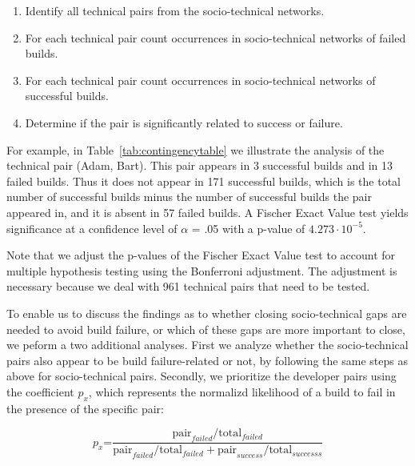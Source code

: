 \documentclass{sig-alternate}
\begin{document}


\begin{enumerate}
\item Identify all technical pairs from the socio-technical networks.
\item For each technical pair count occurrences in socio-technical networks of
failed builds.
\item For each technical pair count occurrences in socio-technical networks of
successful builds.
\item Determine if the pair is significantly related to success or failure.
\end{enumerate}

For example, in Table~\ref{tab:contingencytable} we illustrate the analysis of
the technical pair (Adam, Bart). This pair appears in 3 successful builds and in
13 failed builds. Thus it does not appear in 171 successful builds, which is the total number of successful builds minus the number of successful builds the pair appeared in, and it is absent in 57 failed builds.
A Fischer Exact Value test yields significance at a confidence level of $\alpha$ = .05 with a p-value of $4.273\cdot10^{-5}$.

Note that we adjust the p-values of the Fischer Exact Value test to account for multiple hypothesis testing using the Bonferroni adjustment.
The adjustment is necessary because we deal with 961 technical pairs that need to be tested. 

To enable us to discuss the findings as to whether closing socio-technical gaps
are needed to avoid build failure, or which of these gaps are more important to
close, we peform a two additional analyses. 
First we analyze whether the
socio-technical pairs also appear to be build failure-related or not, by
following the same steps as above for socio-technical pairs. 
%
Secondly, we prioritize the developer pairs using the coefficient $p_x$,
which represents the normalizd likelihood of a build
to fail in the presence of the specific pair:

$$p_x\text{=}\frac{ \text{pair}_{failed} / \text{total}_{failed} }
                     { \text{pair}_{failed} / \text{total}_{failed} + \text{pair}_{success} / \text{total}_{successs}}$$ 
\end{document}
